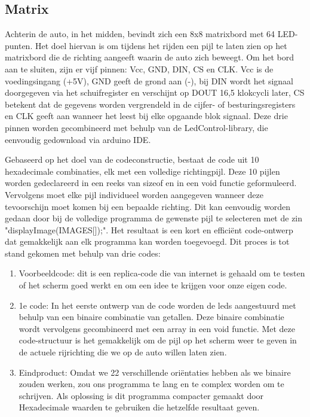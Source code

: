 \subsection{Matrix}
Achterin de auto, in het midden, bevindt zich een 8x8 matrixbord met 64 LED-punten. Het doel hiervan is om tijdens het rijden een pijl te laten zien op het matrixbord die de richting aangeeft waarin de auto zich beweegt. Om het bord aan te sluiten, zijn er vijf pinnen: Vcc, GND, DIN, CS en CLK. Vcc is de voedingsingang (+5V), GND geeft de grond aan (-), bij DIN wordt het signaal doorgegeven via het schuifregister en verschijnt op DOUT 16,5 klokcycli later, CS betekent dat de gegevens worden vergrendeld in de cijfer- of besturingsregisters en CLK geeft aan wanneer het leest bij elke opgaande blok signaal. Deze drie pinnen worden gecombineerd met behulp van de LedControl-library, die eenvoudig gedownload via arduino IDE.

Gebaseerd op het doel van de codeconstructie, bestaat de code uit 10 hexadecimale combinaties, elk met een volledige richtingpijl. Deze 10 pijlen worden gedeclareerd in een reeks van sizeof en in een void functie geformuleerd. Vervolgens moet elke pijl individueel worden aangegeven wanneer deze tevoorschijn moet komen bij een bepaalde richting. Dit kan eenvoudig worden gedaan door bij de volledige programma de gewenste pijl te selecteren met de zin "displayImage(IMAGES[]);". Het resultaat is een kort en efficiënt code-ontwerp dat gemakkelijk aan elk programma kan worden toegevoegd.
Dit proces is tot stand gekomen met behulp van drie codes: 
\begin{enumerate}
    \item Voorbeeldcode: dit is een replica-code die van internet is gehaald om te testen of het scherm goed werkt en om een idee te krijgen voor onze eigen code.
    \item 1e code: In het eerste ontwerp van de code worden de leds aangestuurd met behulp van een binaire combinatie van getallen. Deze binaire combinatie wordt vervolgens gecombineerd met een array in een void functie. Met deze code-structuur is het gemakkelijk om de pijl op het scherm weer te geven in de actuele rijrichting die we op de auto willen laten zien. 
    \item Eindproduct: Omdat we 22 verschillende oriëntaties hebben als we binaire zouden werken, zou ons programma te lang en te complex worden om te schrijven. Als oplossing  is dit programma compacter gemaakt door Hexadecimale waarden te gebruiken die hetzelfde resultaat geven.
\end{enumerate}

